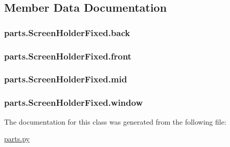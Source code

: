 \subsection{Member Data Documentation}
\hypertarget{classparts_1_1_screen_holder_fixed_aed5720668f62afd26a28fc8151b14964}{}
\subsubsection[{back}]{\setlength{\rightskip}{0pt plus 5cm}parts.\+Screen\+Holder\+Fixed.\+back}\label{classparts_1_1_screen_holder_fixed_aed5720668f62afd26a28fc8151b14964}
\hypertarget{classparts_1_1_screen_holder_fixed_ae30140c4d28a98d4e84ee0e82929d89c}{}
\subsubsection[{front}]{\setlength{\rightskip}{0pt plus 5cm}parts.\+Screen\+Holder\+Fixed.\+front}\label{classparts_1_1_screen_holder_fixed_ae30140c4d28a98d4e84ee0e82929d89c}
\hypertarget{classparts_1_1_screen_holder_fixed_a662619b6a30c976e63cdfdbb75652190}{}
\subsubsection[{mid}]{\setlength{\rightskip}{0pt plus 5cm}parts.\+Screen\+Holder\+Fixed.\+mid}\label{classparts_1_1_screen_holder_fixed_a662619b6a30c976e63cdfdbb75652190}
\hypertarget{classparts_1_1_screen_holder_fixed_a7b501ea434983af081eeb315d4917280}{}
\subsubsection[{window}]{\setlength{\rightskip}{0pt plus 5cm}parts.\+Screen\+Holder\+Fixed.\+window}\label{classparts_1_1_screen_holder_fixed_a7b501ea434983af081eeb315d4917280}


The documentation for this class was generated from the following file\+:\begin{DoxyCompactItemize}
\item 
\hyperlink{parts_8py}{parts.\+py}\end{DoxyCompactItemize}
